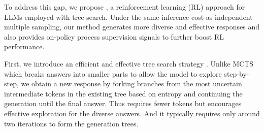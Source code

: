 {%

To address this gap, we propose \model, a reinforcement learning (RL) approach for LLMs employed with tree search. Under the same inference cost as independent multiple sampling, our method generates more diverse and effective responses and also provides on-policy process supervision signals to further boost RL performance.

First, we introduce an efficient and effective tree search strategy \treemodel.
Unlike MCTS which breaks answers into smaller parts to allow the model to explore step-by-step, we obtain a new response by forking branches from the most uncertain intermediate tokens in the existing tree based on entropy and continuing the generation until the final answer. Thus \treemodel requires fewer tokens but encourages effective exploration for the diverse answers.
And it typically requires only around two iterations to form the generation trees.



}
